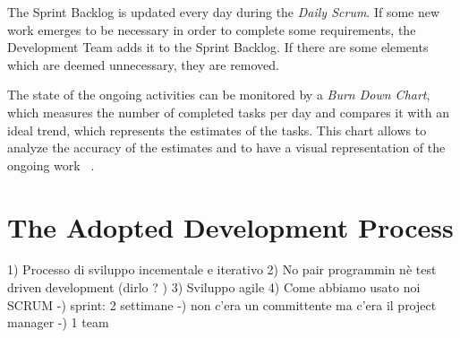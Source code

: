 			The Sprint Backlog is updated every day during the \emph{Daily Scrum}. If some new work emerges to be necessary in order to complete some requirements, the Development Team adds it to the Sprint Backlog. If there are some elements which are deemed unnecessary, they are removed.

			The state of the ongoing activities can be monitored by a \emph{Burn Down Chart}, which measures the number of completed tasks per day and compares it with an ideal trend, which represents the estimates of the tasks. This chart allows to analyze the accuracy of the estimates and to have a visual representation of the ongoing work ~\cite{scrumEnglishGuide}.

					
			
	
	
	\section{The Adopted Development Process}
		1) Processo di sviluppo incementale e iterativo
		2) No pair programmin nè test driven development  (dirlo ? )
		3) Sviluppo agile
		4) Come abbiamo usato noi SCRUM
			-) sprint: 2 settimane
			-) non c'era un committente ma c'era il project manager
			-) 1 team

